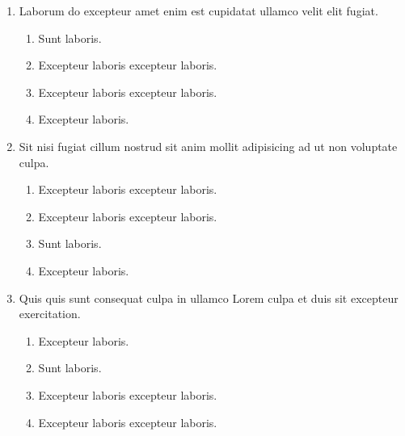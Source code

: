 \documentclass[a4paper,12pt]{article}
\begin{document}
\begin{enumerate}[label=\textbf{\arabic*.}]
\begin{multicols}{2}
\end{multicols}
\item Laborum do excepteur amet enim est cupidatat ullamco velit elit fugiat.
\begin{multicols}{2}
	\begin{enumerate}
		\item  Sunt laboris.
    
		\item  Excepteur laboris excepteur laboris.
    
		\item  Excepteur laboris excepteur laboris.
  
		\item  Excepteur laboris.
    
	\end{enumerate}

\end{multicols}
\item Sit nisi fugiat cillum nostrud sit anim mollit adipisicing ad ut non voluptate culpa.
\begin{multicols}{2}
	\begin{enumerate}
		\item  Excepteur laboris excepteur laboris.
  
		\item  Excepteur laboris excepteur laboris.
    
		\item  Sunt laboris.
    
		\item  Excepteur laboris.
    
	\end{enumerate}

\end{multicols}
\item Quis quis sunt consequat culpa in ullamco Lorem culpa et duis sit excepteur exercitation.
\begin{multicols}{2}
	\begin{enumerate}
		\item  Excepteur laboris.
    
		\item  Sunt laboris.
    
		\item  Excepteur laboris excepteur laboris.
  
		\item  Excepteur laboris excepteur laboris.
    
	\end{enumerate}


\end{multicols}
\end{enumerate}
\end{document}
